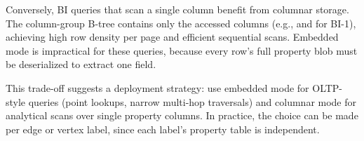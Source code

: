 Conversely, BI queries that scan a single column benefit from columnar storage.
The column-group B-tree contains only the accessed columns (e.g.,  and  for BI-1), achieving high row density per page and efficient sequential scans.
Embedded mode is impractical for these queries, because every row's full property blob must be deserialized to extract one field.

This trade-off suggests a deployment strategy: use embedded mode for OLTP-style queries (point lookups, narrow multi-hop traversals) and columnar mode for analytical scans over single property columns.
In practice, the choice can be made per edge or vertex label, since each label's property table is independent.
